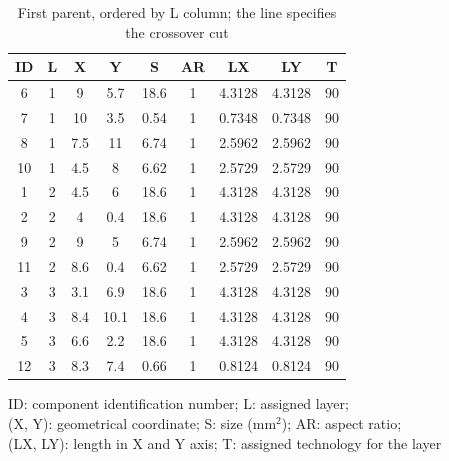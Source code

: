 \begin{table}[h!]
\caption{First parent, ordered by L column; the line specifies the crossover cut}
\begin{center}
\begin{scriptsize}
\begin{tabular}{|c|c|c|c|c|c|c|c|c|}
\hline ID & L & X & Y & S & AR & LX & LY & T\\
\hline 6 & 1 & 9 & 5.7 & 18.6 & 1 & 4.3128 & 4.3128 & 90\\
7 & 1 & 10 & 3.5 & 0.54 & 1 & 0.7348 & 0.7348 & 90\\
8 & 1 & 7.5 & 11 & 6.74 & 1 & 2.5962 & 2.5962 & 90\\
10 & 1 & 4.5 & 8 & 6.62 & 1 & 2.5729 & 2.5729 & 90\\
1 & 2 & 4.5 & 6 & 18.6 & 1 & 4.3128 & 4.3128 & 90\\
2 & 2 & 4 & 0.4 & 18.6 & 1 & 4.3128 & 4.3128 & 90\\
9 & 2 & 9 & 5 & 6.74 & 1 & 2.5962 & 2.5962 & 90\\
\hline
\hline
11 & 2 & 8.6 & 0.4 & 6.62 & 1 & 2.5729 & 2.5729 & 90\\
3 & 3 & 3.1 & 6.9 & 18.6 & 1 & 4.3128 & 4.3128 & 90\\
4 & 3 & 8.4 & 10.1 & 18.6 & 1 & 4.3128 & 4.3128 & 90\\
5 & 3 & 6.6 & 2.2 & 18.6 & 1 & 4.3128 & 4.3128 & 90\\
12 & 3 & 8.3 & 7.4 & 0.66 & 1 & 0.8124 & 0.8124 & 90\\
\hline
\end{tabular}
\end{scriptsize}
\end{center}
\begin{center}
\begin{scriptsize}
ID: component identification number; L: assigned layer;\\
(X, Y): geometrical coordinate; S: size (mm$^2$); AR: aspect ratio;\\
(LX, LY): length in X and Y axis; T: assigned technology for the layer
\end{scriptsize}
\end{center}
\label{tab:firstparentLrow}
\end{table}

